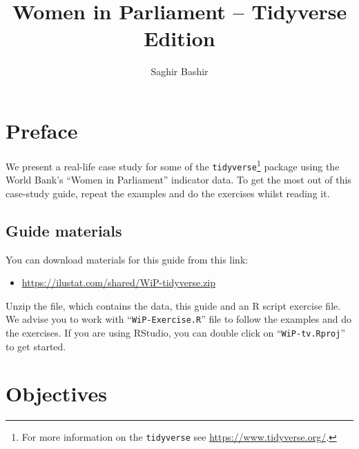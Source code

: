 \documentclass[a4paper,9pt,twocolumn,twoside,printwatermark=false]{pinp}
\title{Women in Parliament -- Tidyverse Edition}
\author[]{Saghir Bashir}
\providecommand{\tightlist}{%
  \setlength{\itemsep}{0pt}\setlength{\parskip}{0pt}}
\begin{document}
\verticaladjustment{-2pt}

\maketitle
\thispagestyle{firststyle}



\hypertarget{preface}{%
\section{Preface}\label{preface}}

We present a real-life case study for some of the
\texttt{tidyverse}\footnote{For more information on the
  \texttt{tidyverse} see \url{https://www.tidyverse.org/}.} package
using the World Bank's ``Women in Parliament'' indicator data. To get
the most out of this case-study guide, repeat the examples and do the
exercises whilst reading it.

\hypertarget{guide-materials}{%
\subsection{Guide materials}\label{guide-materials}}

You can download materials for this guide from this link:

\begin{itemize}
\tightlist
\item
  \url{https://ilustat.com/shared/WiP-tidyverse.zip}
\end{itemize}

Unzip the file, which contains the data, this guide and an R script
exercise file. We advise you to work with ``\texttt{WiP-Exercise.R}''
file to follow the examples and do the exercises. If you are using
RStudio, you can double click on ``\texttt{WiP-tv.Rproj}'' to get
started.

\hypertarget{objectives}{%
\section{Objectives}\label{objectives}}
\end{document}
